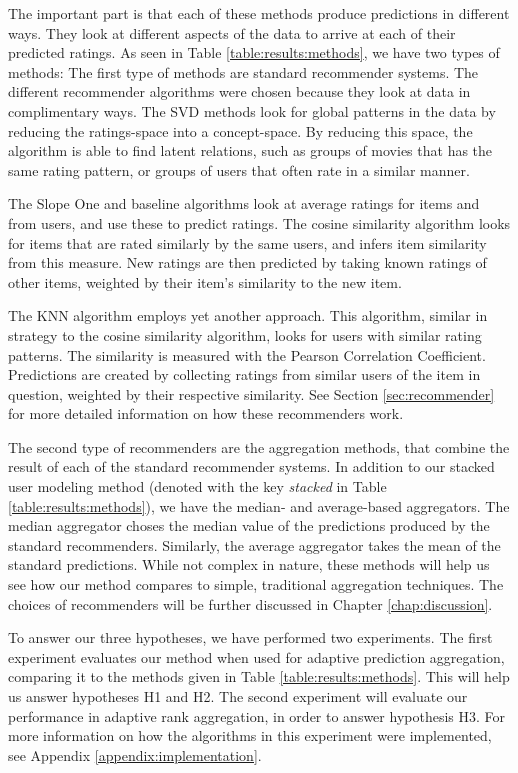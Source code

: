 The important part is that each of these methods produce predictions in different ways.
They look at different aspects of the data to arrive at each of their predicted ratings.
As seen in Table \ref{table:results:methods}, we have two types of methods:
The first type of methods are standard recommender systems.
The different recommender algorithms were chosen because they 
look at data in complimentary ways. 
The SVD methods look for global patterns in the data 
by reducing the ratings-space into a concept-space.
By reducing this space, the algorithm is able to find
latent relations, such as groups of movies that has the same
rating pattern, or groups of users that often rate in a similar manner.

The Slope One and baseline algorithms look at average
ratings for items and from users, and use these to predict ratings.
The cosine similarity algorithm looks for items that are rated
similarly by the same users, and infers item similarity from this measure.
New ratings are then predicted by taking known ratings of other items,
weighted by their item's similarity to the new item.

The KNN algorithm employs yet another approach. This algorithm,
similar in strategy to the cosine similarity algorithm,
looks for users with similar rating patterns.
The similarity is measured with the Pearson Correlation Coefficient.
Predictions are created by collecting ratings from similar users
of the item in question, weighted by their respective similarity.
See Section \ref{sec:recommender} for more 
detailed information on how these recommenders work. 

The second type of recommenders are the aggregation methods, 
that combine the result of each of the standard recommender systems.
In addition to our stacked user modeling method
(denoted with the key \emph{stacked} in Table \ref{table:results:methods}),
we have the median- and average-based aggregators.
The median aggregator choses the median value of the predictions
produced by the standard recommenders.
Similarly, the average aggregator takes the mean of the
standard predictions.
While not complex in nature, these methods
will help us see how our method compares to simple, traditional
aggregation techniques.
The choices of recommenders will be further discussed
in Chapter \ref{chap:discussion}.

To answer our three hypotheses, we have performed two experiments.
The first experiment evaluates our method when used for
adaptive prediction aggregation, comparing it to 
the methods given in Table \ref{table:results:methods}.
This will help us answer hypotheses H1 and H2.
The second experiment will evaluate our performance
in adaptive rank aggregation, in order to answer hypothesis H3.
For more information on how the algorithms
in this experiment were implemented, see Appendix \ref{appendix:implementation}.



